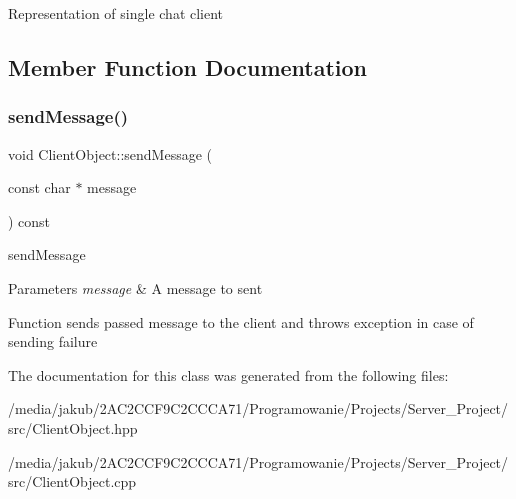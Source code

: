 Representation of single chat client 

\subsection{Member Function Documentation}
\mbox{\label{classClientObject_a4704430f61bd85efd980c6ea083d5374}} 
\subsubsection{\texorpdfstring{send\+Message()}{sendMessage()}}
{\footnotesize\ttfamily void Client\+Object\+::send\+Message (\begin{DoxyParamCaption}\item[{const char $\ast$}]{message }\end{DoxyParamCaption}) const}



send\+Message 


\begin{DoxyParams}{Parameters}
{\em message} & A message to sent\\
\hline
\end{DoxyParams}
Function sends passed message to the client and throws exception in case of sending failure 

The documentation for this class was generated from the following files\+:\begin{DoxyCompactItemize}
\item 
/media/jakub/2\+A\+C2\+C\+C\+F9\+C2\+C\+C\+C\+A71/\+Programowanie/\+Projects/\+Server\+\_\+\+Project/src/Client\+Object.\+hpp\item 
/media/jakub/2\+A\+C2\+C\+C\+F9\+C2\+C\+C\+C\+A71/\+Programowanie/\+Projects/\+Server\+\_\+\+Project/src/Client\+Object.\+cpp\end{DoxyCompactItemize}
